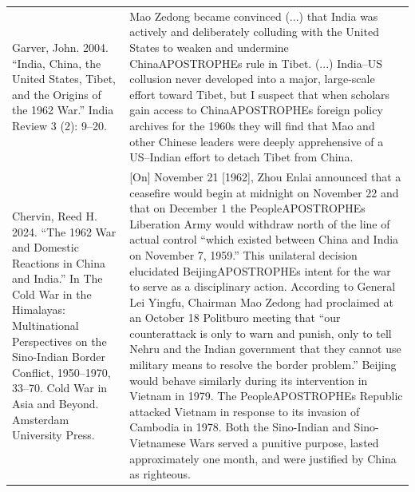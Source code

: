 {\begin{longtable}{p{}p{}}
\\
Garver, John. 2004. “India, China, the United States, Tibet, and the Origins of the 1962 War.” India Review 3 (2): 9–20. & Mao Zedong became convinced (...) that India was actively and deliberately colluding with the United States to weaken and undermine ChinaAPOSTROPHEs rule in Tibet. (...) India–US collusion never developed into a major, large-scale effort toward Tibet, but I suspect that when scholars gain access to ChinaAPOSTROPHEs foreign policy archives for the 1960s they will find that Mao and other Chinese leaders were deeply apprehensive of a US–Indian effort to detach Tibet from China.
\\
Chervin, Reed H. 2024. “The 1962 War and Domestic Reactions in China and India.” In The Cold War in the Himalayas: Multinational Perspectives on the Sino-Indian Border Conflict, 1950–1970, 33–70. Cold War in Asia and Beyond. Amsterdam University Press. & [On] November 21 [1962], Zhou Enlai announced that a ceasefire would begin at midnight on November 22 and that on December 1 the PeopleAPOSTROPHEs Liberation Army would withdraw north of the line of actual control “which existed between China and India on November 7, 1959.” This unilateral decision elucidated BeijingAPOSTROPHEs intent for the war to serve as a disciplinary action. According to General Lei Yingfu, Chairman Mao Zedong had proclaimed at an October 18 Politburo meeting that “our counterattack is only to warn and punish, only to tell Nehru and the Indian government that they cannot use military means to resolve the border problem.” Beijing would behave similarly during its intervention in Vietnam in 1979. The PeopleAPOSTROPHEs Republic attacked Vietnam in response to its invasion of Cambodia in 1978. Both the Sino-Indian and Sino-Vietnamese Wars served a punitive purpose, lasted approximately one month, and were justified by China as righteous.
\\

\end{longtable}}
